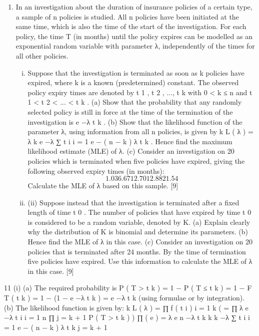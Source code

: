 \documentclass[a4paper,12pt]{article}
\begin{document}
\begin{enumerate}
\item In an investigation about the duration of insurance policies of a certain type, a sample
of n policies is studied. All n policies have been initiated at the same time, which is
also the time of the start of the investigation. For each policy, the time T (in months)
until the policy expires can be modelled as an exponential random variable with
parameter λ, independently of the times for all other policies.
\begin{enumerate}[(i)]
\item %
Suppose that the investigation is terminated as soon as k policies have expired,
where k is a known (predetermined) constant. The observed policy expiry
times are denoted by t 1 , t 2 , ..., t k with 0 < k ≤ n and t 1 < t 2 < ... < t k .
(a) Show that the probability that any randomly selected policy is still in
force at the time of the termination of the investigation is e −λ t k .
(b) Show that the likelihood function of the parameter λ, using information
from all n policies, is given by
k
L ( λ ) = λ k e
−λ ∑ t i
i = 1
e − ( n − k ) λ t k .
Hence find the maximum likelihood estimate (MLE) of λ.
(c)
Consider an investigation on 20 policies which is terminated when five
policies have expired, giving the following observed expiry times (in
months):
\[1.03 6.67 12.70 12.88 21.54\]
Calculate the MLE of λ based on this sample.
[9]
\item (ii)
Suppose instead that the investigation is terminated after a fixed length of time
t 0 . The number of policies that have expired by time t 0 is considered to be a
random variable, denoted by K.
(a) Explain clearly why the distribution of K is binomial and determine its
parameters.
(b) Hence find the MLE of λ in this case.
(c) Consider an investigation on 20 policies that is terminated after 24
months. By the time of termination five policies have expired.
Use this information to calculate the MLE of λ in this case.
[9]
\end{enumerate}
\end{enumerate}
\newpage
11
(i)
(a)
The required probability is
P ( T > t k ) = 1 − P ( T ≤ t k ) = 1 − F T ( t k )
= 1 − (1 − e −λ t k ) = e −λ t k (using formulae or by integration).
(b)
The likelihood function is given by:
k
L ( λ ) = ∏ f ( t i )
i = 1
k
(
= ∏ λ e −λ t i
i = 1
n
∏
j = k + 1
P ( T > t k )
) ∏ ( e ) = λ e
n
−λ t k
k
k
−λ ∑ t i
i = 1
e − ( n − k ) λ t k
j = k + 1
\end{document}
